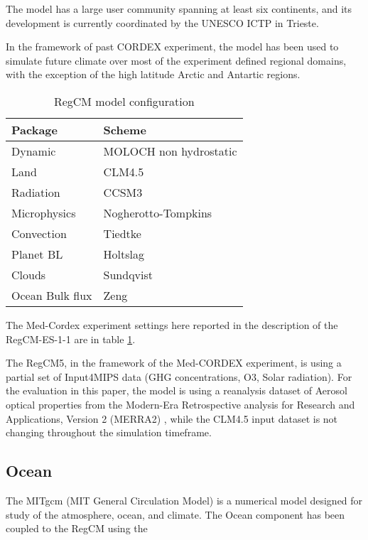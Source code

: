 \documentclass[journal abbreviation, manuscript]{copernicus}
\begin{document}
The model has a large user community spanning at least six continents, and its
development is currently coordinated by the UNESCO ICTP in Trieste.

In the framework of past CORDEX experiment, the model has been used to simulate
future climate over most of the experiment defined regional domains, with the
exception of the high latitude Arctic and Antartic regions.

\begin{table}[]
    \begin{tabular}{|l|l|}
        \hline
        Package & Scheme \\
        \hline
        Dynamic & MOLOCH non hydrostatic \\
        Land & CLM4.5 \\
        Radiation & CCSM3 \\
        Microphysics & Nogherotto-Tompkins \\
        Convection & Tiedtke \\
        Planet BL & Holtslag \\
        Clouds & Sundqvist \\
        Ocean Bulk flux & Zeng \\
        \hline
  \end{tabular}
    \caption{RegCM model configuration}
    \label{table:regcm_conf}
\end{table}

The Med-Cordex experiment settings here reported in the description of the
RegCM-ES-1-1 are in table \ref{table:regcm_conf}.

The RegCM5, in the framework of the Med-CORDEX experiment, is using a partial
set of Input4MIPS data (GHG concentrations, O3, Solar radiation). For the
evaluation in this paper, the model is using a reanalysis dataset of Aerosol
optical properties from the Modern-Era Retrospective analysis for Research
and Applications, Version 2 (MERRA2) \citep{randles-2017,buchard-2017},
while the CLM4.5 input dataset is not changing throughout the simulation
timeframe.

\subsection{Ocean}

The MITgcm (MIT General Circulation Model) is a numerical model designed for
study of the atmosphere, ocean, and climate. The Ocean component has been
coupled to the RegCM using the
\end{document}
